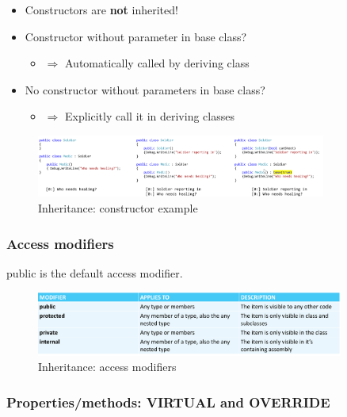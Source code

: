 \documentclass{article}
\newcommand{\bold}[1]{\textbf{#1}}
\begin{document}
\begin{itemize}
    \item Constructors are \bold{not} inherited!
    \item Constructor without parameter in base class?
    \begin{itemize}
        \item $\Rightarrow$ Automatically called by deriving class
    \end{itemize}
    \item No constructor without parameters in base class?
    \begin{itemize}
        \item $\Rightarrow$ Explicitly call it in deriving classes
    \end{itemize}
\end{itemize}

\begin{figure}[H]
    \centering
    \includegraphics[width=0.85\textwidth]{inheritance-constructor.png}
    \caption{Inheritance: constructor example}
\end{figure}

\subsubsection{Access modifiers}

public is the default access modifier.

\begin{figure}[H]
    \centering
    \includegraphics[width=0.9\textwidth]{inheritance-access-modifiers.png}
    \caption{Inheritance: access modifiers}
\end{figure}

\subsubsection{Properties/methods: VIRTUAL and OVERRIDE}
\end{document}
